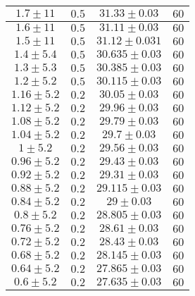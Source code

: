 \documentclass[../main.tex]{subfiles}
\begin{document}
\begin{tabular}{ ||c|c|c|c|| }
        \hline
        $1.7\pm 11$       & $0.5$       & $31.33\pm 0.03$  & $60$     \\
        \hline
        $1.6\pm 11$       & $0.5$       & $31.11\pm 0.03$  & $60$     \\
        \hline
        $1.5\pm 11$       & $0.5$       & $31.12\pm 0.031$ & $60$     \\
        \hline
        $1.4\pm 5.4$      & $0.5$       & $30.635\pm 0.03$ & $60$     \\
        \hline
        $1.3\pm 5.3$      & $0.5$       & $30.385\pm 0.03$ & $60$     \\
        \hline
        $1.2\pm 5.2$      & $0.5$       & $30.115\pm 0.03$ & $60$     \\
        \hline
        $1.16\pm 5.2$     & $0.2$       & $30.05\pm 0.03$  & $60$     \\
        \hline
        $1.12\pm 5.2$     & $0.2$       & $29.96\pm 0.03$  & $60$     \\
        \hline
        $1.08\pm 5.2$     & $0.2$       & $29.79\pm 0.03$  & $60$     \\
        \hline
        $1.04\pm 5.2$     & $0.2$       & $29.7\pm 0.03$   & $60$     \\
        \hline
        $1\pm 5.2$        & $0.2$       & $29.56\pm 0.03$  & $60$     \\
        \hline
        $0.96\pm 5.2$     & $0.2$       & $29.43\pm 0.03$  & $60$     \\
        \hline
        $0.92\pm 5.2$     & $0.2$       & $29.31\pm 0.03$  & $60$     \\
        \hline
        $0.88\pm 5.2$     & $0.2$       & $29.115\pm 0.03$ & $60$     \\
        \hline
        $0.84\pm 5.2$     & $0.2$       & $29\pm 0.03$     & $60$     \\
        \hline
        $0.8\pm 5.2$      & $0.2$       & $28.805\pm 0.03$ & $60$     \\
        \hline
        $0.76\pm 5.2$     & $0.2$       & $28.61\pm 0.03$  & $60$     \\
        \hline
        $0.72\pm 5.2$     & $0.2$       & $28.43\pm 0.03$  & $60$     \\
        \hline
        $0.68\pm 5.2$     & $0.2$       & $28.145\pm 0.03$ & $60$     \\
        \hline
        $0.64\pm 5.2$     & $0.2$       & $27.865\pm 0.03$ & $60$     \\
        \hline
        $0.6\pm 5.2$      & $0.2$       & $27.635\pm 0.03$ & $60$     \\

\end{tabular}
\end{document}
